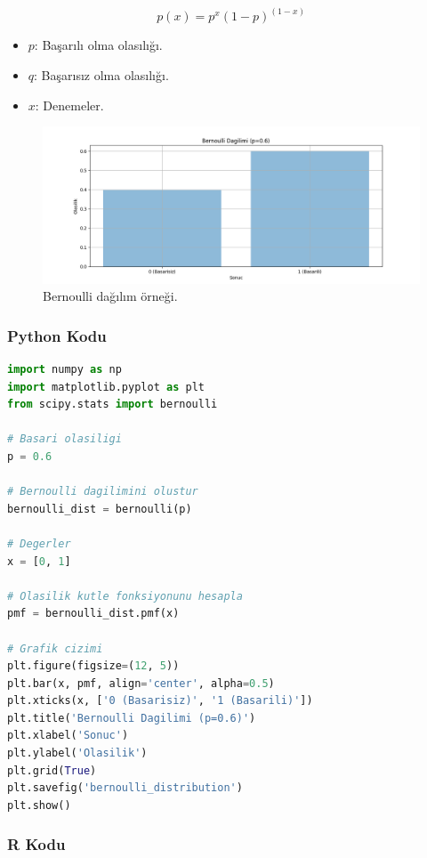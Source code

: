 \[
p(x) = p^x (1 - p)^(1- x)
\]

\begin{itemize}
	\item $p$: Başarılı olma olasılığı.
	\item $q$: Başarısız olma olasılığı.
	\item $x$: Denemeler.
\end{itemize}

\begin{figure}[h]
    \centering
    \includegraphics[width=1\textwidth]{images/bernoulli_distribution.png}
    \caption{Bernoulli dağılım örneği.}
    \label{fig:enter-label}
\end{figure}

\subsubsection{Python Kodu}

\begin{lstlisting}[language=Python]
import numpy as np
import matplotlib.pyplot as plt
from scipy.stats import bernoulli

# Basari olasiligi
p = 0.6

# Bernoulli dagilimini olustur
bernoulli_dist = bernoulli(p)

# Degerler
x = [0, 1]

# Olasilik kutle fonksiyonunu hesapla
pmf = bernoulli_dist.pmf(x)

# Grafik cizimi
plt.figure(figsize=(12, 5))
plt.bar(x, pmf, align='center', alpha=0.5)
plt.xticks(x, ['0 (Basarisiz)', '1 (Basarili)'])
plt.title('Bernoulli Dagilimi (p=0.6)')
plt.xlabel('Sonuc')
plt.ylabel('Olasilik')
plt.grid(True)
plt.savefig('bernoulli_distribution')
plt.show()
\end{lstlisting}

\subsubsection{R Kodu}

